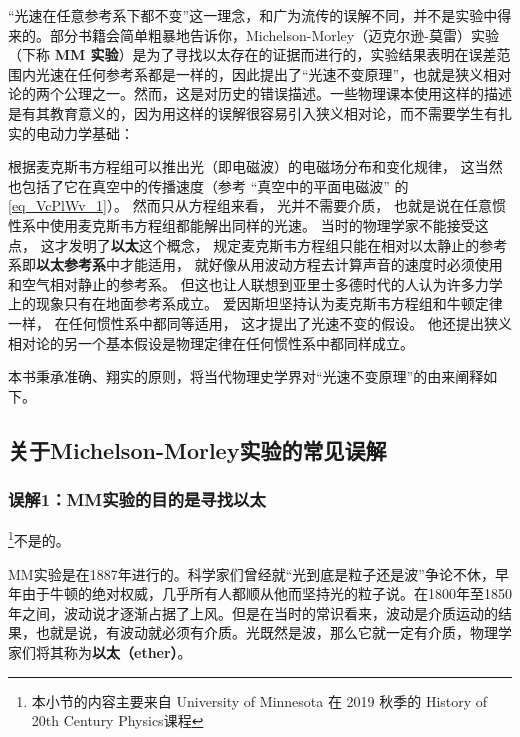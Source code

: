 

“光速在任意参考系下都不变”这一理念，和广为流传的误解不同，并不是实验中得来的。部分书籍会简单粗暴地告诉你，Michelson-Morley（迈克尔逊-莫雷）实验（下称 \textbf{MM 实验}）是为了寻找以太存在的证据而进行的，实验结果表明在误差范围内光速在任何参考系都是一样的，因此提出了“光速不变原理”，也就是狭义相对论的两个公理之一。然而，这是对历史的错误描述。一些物理课本使用这样的描述是有其教育意义的，因为用这样的误解很容易引入狭义相对论，而不需要学生有扎实的电动力学基础：

根据麦克斯韦方程组可以推出光（即电磁波）的电磁场分布和变化规律， 这当然也包括了它在真空中的传播速度（参考 “真空中的平面电磁波” 的 \autoref{eq_VcPlWv_1}）。 然而只从方程组来看， 光并不需要介质， 也就是说在任意惯性系中使用麦克斯韦方程组都能解出同样的光速。 当时的物理学家不能接受这点， 这才发明了\textbf{以太}这个概念， 规定麦克斯韦方程组只能在相对以太静止的参考系即\textbf{以太参考系}中才能适用， 就好像从用波动方程去计算声音的速度时必须使用和空气相对静止的参考系。 但这也让人联想到亚里士多德时代的人认为许多力学上的现象只有在地面参考系成立。 爱因斯坦坚持认为麦克斯韦方程组和牛顿定律一样， 在任何惯性系中都同等适用， 这才提出了光速不变的假设。 他还提出狭义相对论的另一个基本假设是物理定律在任何惯性系中都同样成立。

本书秉承准确、翔实的原则，将当代物理史学界对“光速不变原理”的由来阐释如下。

\subsection{关于Michelson-Morley实验的常见误解}

\subsubsection{误解1：MM实验的目的是寻找以太}

\footnote{本小节的内容主要来自 University of Minnesota 在 2019 秋季的 History of 20th Century Physics课程}不是的。

MM实验是在1887年进行的。科学家们曾经就“光到底是粒子还是波”争论不休，早年由于牛顿的绝对权威，几乎所有人都顺从他而坚持光的粒子说。在1800年至1850年之间，波动说才逐渐占据了上风。但是在当时的常识看来，波动是介质运动的结果，也就是说，有波动就必须有介质。光既然是波，那么它就一定有介质，物理学家们将其称为\textbf{以太（ether）}。

